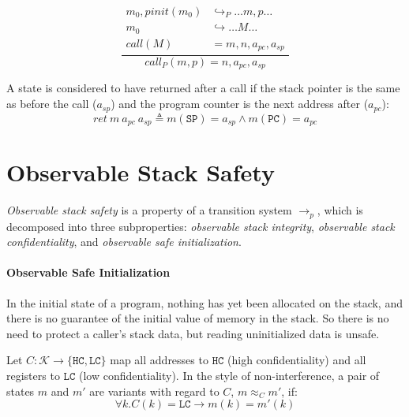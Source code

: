 \documentclass[conference]{IEEEtran}
\begin{document}
      \[\frac{\begin{split}
        m_0,\mathit{pinit}(m_0) & \hookrightarrow_P \dots m,p \dots \\ %
        m_0 & \hookrightarrow \dots M \dots \\
        \mathit{call}(M) & = m, n, a_{pc}, a_{sp}\end{split}}
             {\mathit{call}_P(m,p) = n, a_{pc}, a_{sp}}\]

      A state is considered to have returned after a call if the stack pointer is the same as before the call
      (\(a_{sp}\)) and the program counter is the next address after (\(a_{pc}\)):
      \[\mathit{ret}\ m\ a_{pc}\ a_{sp} \triangleq m(\mathtt{SP}) = a_{sp} \land m(\mathtt{PC}) = a_{pc}\]

  \section{Observable Stack Safety}

    {\it Observable stack safety} is a property of a transition system \(\longrightarrow_p\),
    which is decomposed into three subproperties: {\it observable stack integrity},
    {\it observable stack confidentiality}, and {\it observable safe initialization}. 


    \paragraph{Observable Safe Initialization}

      In the initial state of a program, nothing has yet been allocated on the stack, and
      there is no guarantee of the initial value of memory in the stack. So there is no
      need to protect a caller's stack data, but reading uninitialized data is unsafe.

      Let \(C : \mathcal{K} \rightarrow \{\mathtt{HC},\mathtt{LC}\}\) map all addresses
      to \(\mathtt{HC}\) (high confidentiality) and all registers to \(\mathtt{LC}\)
      (low confidentiality). In the style of non-interference, a pair of states \(m\)
      and \(m'\) are variants with regard to \(C\), \(m \approx_C m'\), if:
      \[\forall k . C(k) = \mathtt{LC} \rightarrow m(k) = m'(k)\]
      
\end{document}
